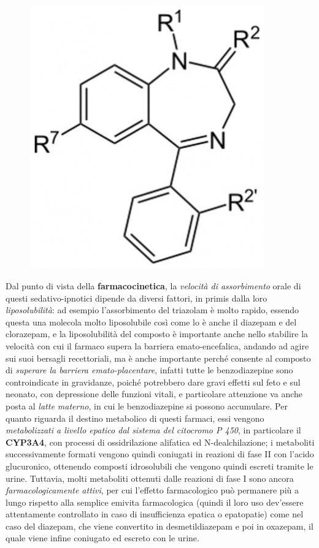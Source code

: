 \begin{itemize}
\begin{figure}[!ht]
\centering
	\includegraphics[width=0.9\textwidth]{04/image1.jpeg}
\end{figure}

Dal
punto di vista della \textbf{farmacocinetica}, la \emph{velocità di
assorbimento} orale di questi sedativo-ipnotici dipende da diversi
fattori, in primis dalla loro \emph{liposolubilità}: ad esempio
l'assorbimento del triazolam è molto rapido, essendo questa una molecola
molto liposolubile così come lo è anche il diazepam e del clorazepam, e
la liposolubilità del composto è importante anche nello stabilire la
velocità con cui il farmaco supera la barriera emato-encefalica, andando
ad agire sui suoi bersagli recettoriali, ma è anche importante perché
consente al composto di \emph{superare la barriera emato-placentare},
infatti tutte le benzodiazepine sono controindicate in gravidanze,
poiché potrebbero dare gravi effetti sul feto e sul neonato, con
depressione delle funzioni vitali, e particolare attenzione va anche
posta al \emph{latte materno}, in cui le benzodiazepine si possono
accumulare. Per quanto riguarda il destino metabolico di questi farmaci,
essi vengono \emph{metabolizzati a livello epatico dal sistema del
citocromo P 450}, in particolare il \textbf{CYP3A4}, con processi di
ossidrilazione alifatica ed N-dealchilazione; i metaboliti
successivamente formati vengono quindi coniugati in reazioni di fase II
con l'acido glucuronico, ottenendo composti idrosolubili che vengono
quindi escreti tramite le urine. Tuttavia, molti metaboliti ottenuti
dalle reazioni di fase I sono ancora \emph{farmacologicamente attivi},
per cui l'effetto farmacologico può permanere più a lungo rispetto alla
semplice emivita farmacologica (quindi il loro uso dev'essere
attentamente controllato in caso di insufficienza epatica o epatopatie)
come nel caso del diazepam, che viene convertito in desmetildiazepam e
poi in oxazepam, il quale viene infine coniugato ed escreto con le
urine.


\end{itemize}
